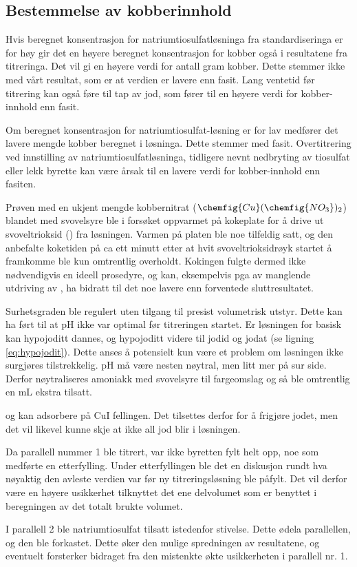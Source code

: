 \subsection{Bestemmelse av kobberinnhold}
Hvis beregnet konsentrasjon for natriumtiosulfatløsninga fra standardiseringa er for høy gir det en høyere beregnet konsentrasjon for kobber også i resultatene fra titreringa. Det vil gi en høyere verdi for antall gram kobber. Dette stemmer ikke med vårt resultat, som er at verdien er lavere enn fasit. Lang ventetid før titrering kan også føre til tap av jod, som fører til en høyere verdi for kobber-innhold enn fasit.

Om beregnet konsentrasjon for natriumtiosulfat-løsning er for lav medfører det lavere mengde kobber beregnet i løsninga. Dette stemmer med fasit. Overtitrering ved innstilling av natriumtiosulfatløsninga, tidligere nevnt nedbryting av tiosulfat eller lekk byrette kan være årsak til en lavere verdi for kobber-innhold enn fasiten.

Prøven med en ukjent mengde kobbernitrat ($\chemfig{Cu} (\chemfig{NO_3})_2$) blandet med svovelsyre ble i forsøket oppvarmet på kokeplate for å drive ut svoveltrioksid () fra løsningen. Varmen på platen ble noe tilfeldig satt, og den anbefalte koketiden på ca ett minutt etter at hvit svoveltrioksidrøyk startet å framkomme ble kun omtrentlig overholdt. Kokingen fulgte dermed ikke nødvendigvis en ideell prosedyre, og kan, eksempelvis pga av manglende utdriving av , ha bidratt til det noe lavere enn forventede sluttresultatet.


Surhetsgraden ble regulert uten tilgang til presist volumetrisk utstyr. Dette kan ha ført til at pH ikke var optimal før titreringen startet. Er løsningen for basisk kan hypojoditt dannes, og hypojoditt videre til jodid og jodat (se ligning \ref{eq:hypojodit}). Dette anses å potensielt kun være et problem om løsningen ikke surgjøres tilstrekkelig. pH må være nesten nøytral, men litt mer på sur side. Derfor nøytraliseres amoniakk med svovelsyre til fargeomslag og så ble omtrentlig en mL ekstra tilsatt.

 og  kan adsorbere på CuI fellingen. Det tilsettes derfor  for å frigjøre jodet, men det vil likevel kunne skje at ikke all jod blir i løsningen. 

Da parallell nummer 1 ble titrert, var ikke byretten fylt helt opp, noe som medførte en etterfylling. Under etterfyllingen ble det en diskusjon rundt hva nøyaktig den avleste verdien var før ny titreringsløsning ble påfylt. Det vil derfor være en høyere usikkerhet tilknyttet det ene delvolumet som er benyttet i beregningen av det totalt brukte volumet.

I parallell 2 ble natriumtiosulfat tilsatt istedenfor stivelse. Dette ødela parallellen, og den ble forkastet. Dette øker den mulige spredningen av resultatene, og eventuelt forsterker bidraget fra den mistenkte økte usikkerheten i parallell nr. 1.



